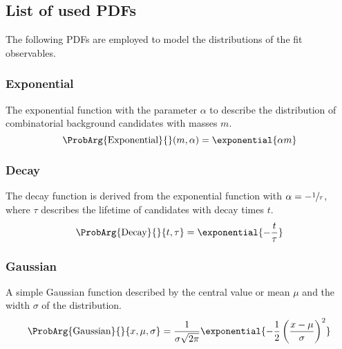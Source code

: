 \subsection{List of used \aclp{PDF}}
\label{sec:measurement_of_sin2beta:likelihood_fit:pdfs}

The following \acp{PDF} are employed to model the distributions of the fit
observables.

\subsubsection{Exponential}
\label{sec:measurement_of_sin2beta:likelihood_fit:pdfs:exponential}

The exponential function with the parameter $\alpha$ to describe \eg the
distribution of combinatorial background candidates with masses $m$.
%
\begin{equation}\label{eq:measurement_of_sin2beta:likelihood_fit:pdfs:exponential}
  \ProbArg{\text{Exponential}}{}(m, \alpha) = \exponential{\alpha m}
\end{equation}

\subsubsection{Decay}
\label{sec:measurement_of_sin2beta:likelihood_fit:pdfs:decay}

The decay function is derived from the exponential function with $\alpha =
-\sfrac{1}{\tau}$, where $\tau$ describes the lifetime of candidates with decay
times $t$.
%
\begin{equation}\label{eq:measurement_of_sin2beta:likelihood_fit:pdfs:decay}
  \ProbArg{\text{Decay}}{}{t, \tau} = \exponential{- \frac{t}{\tau}}
\end{equation}

\subsubsection{Gaussian}
\label{sec:measurement_of_sin2beta:likelihood_fit:pdfs:gaussian}

A simple Gaussian function described by the central value or mean $\mu$ and the
width $\sigma$ of the distribution.
%
\begin{equation}\label{eq:measurement_of_sin2beta:likelihood_fit:pdfs:gaussian}
  \ProbArg{\text{Gaussian}}{}{x, \mu, \sigma} = \frac{1}{\sigma\sqrt{2\pi}}\exponential{-\frac{1}{2} \left(\frac{x-\mu}{\sigma}\right)^2}
\end{equation}

